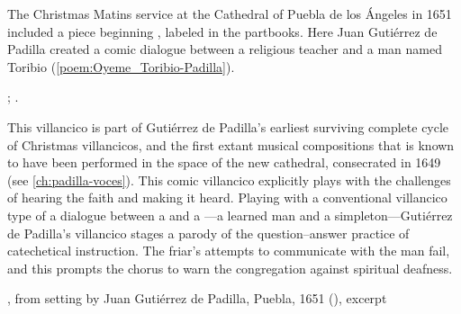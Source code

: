 The Christmas Matins service at the Cathedral of Puebla de los Ángeles in 1651
included a piece beginning , labeled  in
the partbooks. 
Here Juan Gutiérrez de Padilla created a comic dialogue between a religious
teacher and a  man named Toribio
(\cref{poem:Oyeme_Toribio-Padilla}).%
\begin{Footnote}
    ; \autocites{Stanford:Catalog}{Puebla:Microfilm}.
\end{Footnote}
This villancico is part of Gutiérrez de Padilla's earliest surviving complete
cycle of Christmas villancicos, and the first extant musical compositions that
is known to have been performed in the space of the new cathedral, consecrated
in 1649 (see \cref{ch:padilla-voces}).
This comic  villancico explicitly plays with the challenges of
hearing the faith and making it heard.
Playing with a conventional villancico type of a dialogue between a
 and a ---a learned man and a
simpleton---Gutiérrez de Padilla's villancico stages a parody of the
question--answer practice of catechetical instruction.
The friar's attempts to communicate with the  man fail, and this
prompts the chorus to warn the congregation against spiritual deafness.

{, from setting by Juan Gutiérrez de Padilla,
Puebla, 1651 (), excerpt}

